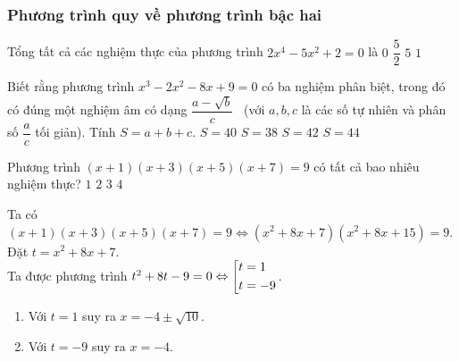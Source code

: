 \subsubsection{Phương trình quy về phương trình bậc hai}
\begin{bt}
	Tổng tất cả các nghiệm thực của phương trình $2x^4 -5x^2+2=0$ là
	\choice
	{\True $0$}
	{$\dfrac{5}{2}$}
	{$5$}
	{$1$}
\end{bt}
\begin{bt}
	Biết rằng phương trình $x^3-2x^2-8x+9=0$ có ba nghiệm phân biệt, trong đó có đúng một nghiệm âm có dạng $\dfrac{a-\sqrt{b}}{c}$ \ (với $a, b, c$ là các số tự nhiên và phân số $\dfrac{a}{c}$ tối giản). Tính $S=a+b+c$.
	\choice
	{\True $S=40$}
	{$S=38$}
	{$S=42$}
	{$S=44$}
\end{bt}
\begin{bt}
	Phương trình $\left( x +1 \right)\left( x +3\right)\left( x +5 \right)\left( x +7\right)=9$ có tất cả bao nhiêu nghiệm thực?
	\choice
	{$1$}
	{$2$}
	{\True $3$}
	{$4$}
	\loigiai 
	{Ta có $\left( x +1 \right)\left( x +3\right)\left( x +5 \right)\left( x +7\right)=9 \Leftrightarrow \left( x^2 +8x+7\right)\left( x^2 +8x+15\right)=9$.\\
		Đặt $t=x^2 +8x+7$. \\
		Ta được phương trình $t^2+8t-9=0\Leftrightarrow \left[\begin{aligned}&t=1\\&t=-9\end{aligned}\right.$.
		\begin{enumerate}[TH1.]
			\item Với $t=1$ suy ra $x=-4\pm\sqrt{10}$.
			\item Với $t=-9$ suy ra $x=-4$.
		\end{enumerate}
	}
\end{bt}
